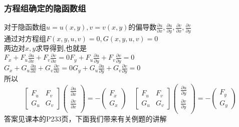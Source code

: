\documentclass[xetex]{beamer}
\begin{document}
\begin{frame}
\frametitle{方程组确定的隐函数组}
	对于隐函数组$u=u(x,y),v=v(x,y)$的偏导数$\frac{\partial u}{\partial x},\frac{\partial u}{\partial y},\frac{\partial v}{\partial x},\frac{\partial v}{\partial y}$\\
	通过对方程组$F(x,y,u,v)=0,G(x,y,u,v)=0$
	\\两边对$x,y$求导得到,也就是\\
	$F_x+F_u\frac{\partial u}{\partial x}+F_v\frac{\partial v}{\partial x}=0$\quad $F_y+F_u\frac{\partial u}{\partial y}+F_v\frac{\partial v}{\partial y}=0$\\
	$G_x+G_u\frac{\partial u}{\partial x}+G_v\frac{\partial v}{\partial x}=0$\quad $G_y+G_u\frac{\partial u}{\partial y}+G_v\frac{\partial v}{\partial y}=0$\\
	所以$$\left[
		\begin{matrix}
			F_u & F_v\\
			G_u & G_v
		\end{matrix}
	\right]\left(
		\begin{matrix}
			\frac{\partial u}{\partial x}\\
			\frac{\partial v}{\partial x}\\
		\end{matrix}
	\right)=-\left(
		\begin{matrix}
			F_x\\
			G_x
		\end{matrix}
	\right)\quad
	\left[
	\begin{matrix}
	F_u & F_v\\
	G_u & G_v
	\end{matrix}
	\right]\left(
	\begin{matrix}
	\frac{\partial u}{\partial y}\\
	\frac{\partial v}{\partial y}\\
	\end{matrix}
	\right)=-\left(
	\begin{matrix}
	F_y\\
	G_y
	\end{matrix}
	\right)
	$$
	答案见课本的P233页，下面我们带来有关例题的讲解\\

	
\end{frame}
\end{document}
